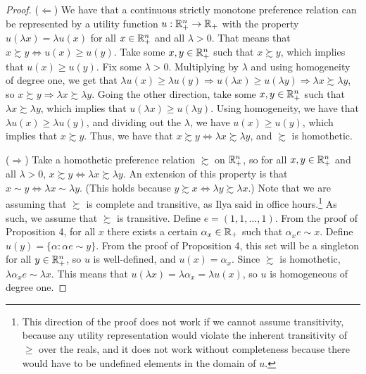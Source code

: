 \documentclass[12pt]{article}
\begin{document}
\medskip

\begin{proof} 
    ($\Longleftarrow$) We have that a continuous strictly monotone preference relation can be represented by a utility function $u : \mathbb{R}^n_+ \to \mathbb{R}_+$ with the property $u(\lambda x) = \lambda u(x)$ for all $x \in \mathbb{R}^n_+$ and all $\lambda > 0$. That means that $x \succsim y \Longleftrightarrow u(x) \ge u(y)$. Take some $x,y \in \mathbb{R}^n_+$ such that $x \succsim y$, which implies that $u(x) \ge u(y)$. Fix some $\lambda > 0$. Multiplying by $\lambda$ and using homogeneity of degree one, we get that $\lambda u(x) \ge \lambda u(y) \Longrightarrow u(\lambda x) \ge u(\lambda y) \Longrightarrow \lambda x \succsim \lambda y$, so $x \succsim y \Longrightarrow \lambda x \succsim \lambda y$. Going the other direction, take some $x,y \in \mathbb{R}^n_+$ such that $\lambda x \succsim \lambda y$, which implies that $u(\lambda x) \ge u(\lambda y)$. Using homogeneity, we have that $\lambda u(x) \ge \lambda u(y)$, and dividing out the $\lambda$, we have $u(x) \ge u(y)$, which implies that $x \succsim y$. Thus, we have that $x \succsim y \Longleftrightarrow \lambda x \succsim \lambda y$, and $\succsim$ is homothetic.
    
    \medskip

    ($\Longrightarrow$) Take a homothetic preference relation $\succsim$ on $\mathbb{R}^n_+$, so for all $x,y \in \mathbb{R}^n_+$ and all $\lambda > 0$, $x \succsim y \Longleftrightarrow \lambda x \succsim \lambda y$. An extension of this property is that $x \sim y \Longleftrightarrow \lambda x \sim \lambda y$. (This holds because $y \succsim x \Longleftrightarrow \lambda y \succsim \lambda x$.) Note that we are assuming that $\succsim$ is complete and transitive, as Ilya said in office hours.\footnote{This direction of the proof does not work if we cannot assume transitivity, because any utility representation would violate the inherent transitivity of $\ge$ over the reals, and it does not work without completeness because there would have to be undefined elements in the domain of $u$.} As such, we assume that $\succsim$ is transitive. Define $e = (1,1,\dots,1)$. From the proof of Proposition 4, for all $x$ there exists a certain $\alpha_x \in \mathbb{R}_+$ such that $\alpha_x e \sim x$. Define $u(y) = \{ \alpha : \alpha e \sim y\}$. From the proof of Proposition 4, this set will be a singleton for all $y \in \mathbb{R}^n_+$, so $u$ is well-defined, and $u(x) = \alpha_x$. Since $\succsim$ is homothetic, $\lambda \alpha_x e \sim \lambda x$. This means that $u(\lambda x) = \lambda \alpha_x = \lambda u(x)$, so $u$ is homogeneous of degree one.

\end{proof}
\end{document}
